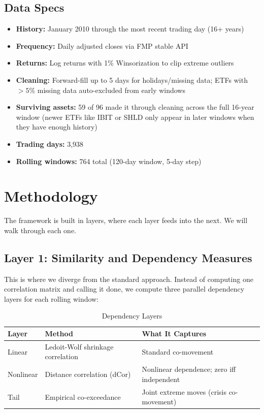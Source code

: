 \documentclass[12pt, letterpaper]{article}
\begin{document}
\subsection{Data Specs}

\begin{itemize}
    \item \textbf{History:} January 2010 through the most recent trading day (16+ years)
    \item \textbf{Frequency:} Daily adjusted closes via FMP stable API
    \item \textbf{Returns:} Log returns with 1\% Winsorization to clip extreme outliers
    \item \textbf{Cleaning:} Forward-fill up to 5 days for holidays/missing data; ETFs with $>5\%$ missing data auto-excluded from early windows
    \item \textbf{Surviving assets:} 59 of 96 made it through cleaning across the full 16-year window (newer ETFs like IBIT or SHLD only appear in later windows when they have enough history)
    \item \textbf{Trading days:} 3,938
    \item \textbf{Rolling windows:} 764 total (120-day window, 5-day step)
\end{itemize}

\section{Methodology}

The framework is built in layers, where each layer feeds into the next. We will walk through each one.

\subsection{Layer 1: Similarity and Dependency Measures}

This is where we diverge from the standard approach. Instead of computing one correlation matrix and calling it done, we compute three parallel dependency layers for each rolling window:

\begin{table}[H]
\centering
\caption{Dependency Layers}
\begin{tabular}{@{}lll@{}}
\toprule
\textbf{Layer} & \textbf{Method} & \textbf{What It Captures} \\
\midrule
Linear & Ledoit-Wolf shrinkage correlation & Standard co-movement \\
Nonlinear & Distance correlation (dCor) & Nonlinear dependence; zero iff independent \\
Tail & Empirical co-exceedance & Joint extreme moves (crisis co-movement) \\
\bottomrule
\end{tabular}
\end{table}
\end{document}
